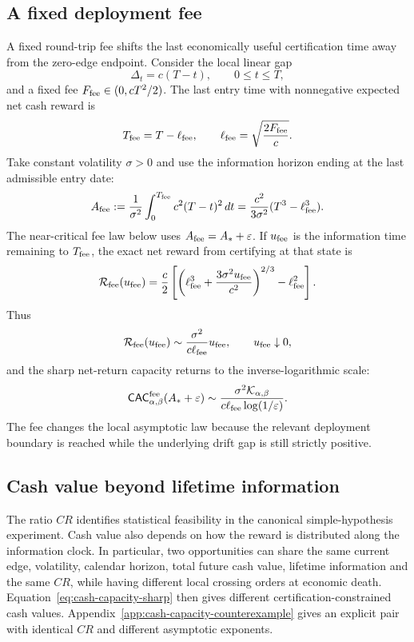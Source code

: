\documentclass[11pt]{article}
\numberwithin{equation}{section}
\theoremstyle{plain}
\theoremstyle{definition}
\theoremstyle{remark}
\begin{document}
\subsection{A fixed deployment fee}\label{fixed-transaction-fees}

A fixed round-trip fee shifts the last economically useful certification time away from the zero-edge endpoint.  Consider the local linear gap
\[
\Delta_t=c(T-t),\qquad 0\le t\le T,
\]
and a fixed fee $F_{\rm fee}\in(0,cT^2/2)$.  The last entry time with nonnegative expected net cash reward is
\[
T_{\rm fee}=T-\ell_{\rm fee},
\qquad
\ell_{\rm fee}=\sqrt{\frac{2F_{\rm fee}}{c}}.
\]
Take constant volatility $\sigma>0$ and use the information horizon
ending at the last admissible entry date:
\[
A_{\rm fee}:=\frac1{\sigma^2}\int_0^{T_{\rm fee}}c^2(T-t)^2\,dt
=\frac{c^2}{3\sigma^2}(T^3-\ell_{\rm fee}^3).
\]
The near-critical fee law below uses $A_{\rm fee}=A_*+\varepsilon$.
If $u_{\rm fee}$ is the information time remaining to $T_{\rm fee}$, the exact net reward from certifying at that state is
\begin{equation}\label{eq:fixed-fee-reward}
\mathcal R_{\rm fee}(u_{\rm fee})
=
\frac{c}{2}
\left[
\left(\ell_{\rm fee}^3+\frac{3\sigma^2u_{\rm fee}}{c^2}\right)^{2/3}
-\ell_{\rm fee}^2
\right].
\end{equation}
Thus
\[
\mathcal R_{\rm fee}(u_{\rm fee})
\sim\frac{\sigma^2}{c\ell_{\rm fee}}u_{\rm fee},
\qquad u_{\rm fee}\downarrow0,
\]
and the sharp net-return capacity returns to the inverse-logarithmic scale:
\begin{equation}\label{eq:fixed-fee-capacity}
\mathsf{CAC}^{\rm fee}_{\alpha,\beta}(A_*+\varepsilon)
\sim
\frac{\sigma^2\mathcal K_{\alpha,\beta}}
{c\ell_{\rm fee}\log(1/\varepsilon)}.
\end{equation}
The fee changes the local asymptotic law because the relevant deployment boundary is reached while the underlying drift gap is still strictly positive.

\subsection{Cash value beyond lifetime information}\label{cr-not-economic-ranking}

The ratio $CR$ identifies statistical feasibility in the canonical simple-hypothesis experiment.  Cash value also depends on how the reward is distributed along the information clock.  In particular, two opportunities can share the same current edge, volatility, calendar horizon, total future cash value, lifetime information and the same $CR$, while having different local crossing orders at economic death.  Equation~\eqref{eq:cash-capacity-sharp} then gives different certification-constrained cash values.  Appendix~\ref{app:cash-capacity-counterexample} gives an explicit pair with identical $CR$ and different asymptotic exponents.
\end{document}
